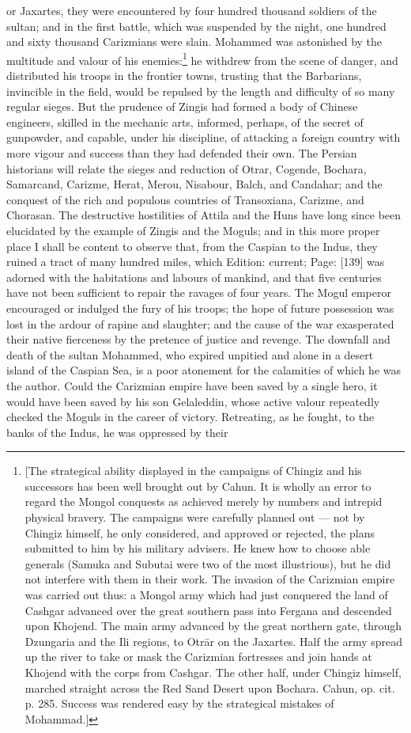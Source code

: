 or Jaxartes, they were encountered by four hundred thousand soldiers of the sultan; and in the first battle, which was suspended by the night, one hundred and sixty thousand Carizmians were slain. Mohammed was astonished by the multitude and valour of his enemies:\footnote{[The strategical ability displayed in the campaigns of Chingiz and his successors has been well brought out by Cahun. It is wholly an error to regard the Mongol conquests as achieved merely by numbers and intrepid physical bravery. The campaigns were carefully planned out \texthebrew{—} not by Chingiz himself, he only considered, and approved or rejected, the plans submitted to him by his military advisers. He knew how to choose able generals (Samuka and Subutai were two of the most illustrious), but he did not interfere with them in their work. The invasion of the Carizmian empire was carried out thus: a Mongol army which had just conquered the land of Cashgar advanced over the great southern pass into Fergana and descended upon Khojend. The main army advanced by the great northern gate, through Dzungaria and the Ili regions, to Otrār on the Jaxartes. Half the army spread up the river to take or mask the Carizmian fortresses and join hands at Khojend with the corps from Cashgar. The other half, under Chingiz himself, marched straight across the Red Sand Desert upon Bochara. Cahun, op. cit. p. 285. Success was rendered easy by the strategical mistakes of Mohammad.]} he withdrew from the scene of danger, and distributed his troops in the frontier towns, trusting that the Barbarians, invincible in the field, would be repulsed by the length and difficulty of so many regular sieges. But the prudence of Zingis had formed a body of Chinese engineers, skilled in the mechanic arts, informed, perhaps, of the secret of gunpowder, and capable, under his discipline, of attacking a foreign country with more vigour and success than they had defended their own. The Persian historians will relate the sieges and reduction of Otrar, Cogende, Bochara, Samarcand, Carizme, Herat, Merou, Nisabour, Balch, and Candahar; and the conquest of the rich and populous countries of Transoxiana, Carizme, and Chorasan. The destructive hostilities of Attila and the Huns have long since been elucidated by the example of Zingis and the Moguls; and in this more proper place I shall be content to observe that, from the Caspian to the Indus, they ruined a tract of many hundred miles, which Edition: current; Page: [139] was adorned with the habitations and labours of mankind, and that five centuries have not been sufficient to repair the ravages of four years. The Mogul emperor encouraged or indulged the fury of his troops; the hope of future possession was lost in the ardour of rapine and slaughter; and the cause of the war exasperated their native fierceness by the pretence of justice and revenge. The downfall and death of the sultan Mohammed, who expired unpitied and alone in a desert island of the Caspian Sea, is a poor atonement for the calamities of which he was the author. Could the Carizmian empire have been saved by a single hero, it would have been saved by his son Gelaleddin, whose active valour repeatedly checked the Moguls in the career of victory. Retreating, as he fought, to the banks of the Indus, he was oppressed by their 